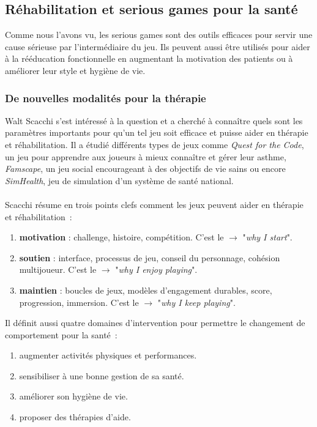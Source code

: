 \subsection{Réhabilitation et serious games pour la santé}
Comme nous l'avons vu, les serious games sont des outils efficaces pour servir une cause sérieuse par l'intermédiaire du jeu. Ils peuvent aussi être utilisés pour aider à la rééducation fonctionnelle en augmentant la motivation des patients ou à améliorer leur style et hygiène de vie.
		\subsubsection{De nouvelles modalités pour la thérapie}
Walt Scacchi\cite{Scac11} s'est intéressé à la question et a cherché à connaître quels sont les paramètres importants pour qu'un tel jeu soit efficace et puisse aider en thérapie et réhabilitation. Il a étudié différents types de jeux comme \emph{Quest for the Code}, un jeu pour apprendre aux joueurs à mieux connaître et gérer leur asthme, \emph{Famscape}, un jeu social encourageant à des objectifs de vie sains ou encore \emph{SimHealth}, jeu de simulation d'un système de santé national.

\paragraph{}
Scacchi\cite{Scac11} résume en trois points clefs comment les jeux peuvent aider en thérapie et réhabilitation~:
\begin{enumerate}
	\item \textbf{motivation }: challenge, histoire, compétition. C'est le $\rightarrow $ "\emph{why I start}".
	\item \textbf{soutien} : interface, processus de jeu, conseil du personnage, cohésion multijoueur. C'est le $\rightarrow $ "\emph{why I enjoy playing}".	
	\item \textbf{maintien} : boucles de jeux, modèles d'engagement durables, score, progression, immersion. C'est le $\rightarrow $ "\emph{why I keep playing}".
\end{enumerate}

Il définit aussi quatre domaines d'intervention pour permettre le changement de comportement pour la santé\cite{Scac11}~:
\begin{enumerate}
	\item augmenter activités physiques et performances.
	\item sensibiliser à une bonne gestion de sa santé.
	\item améliorer son hygiène de vie.
	\item proposer des thérapies d'aide.
\end{enumerate}
		

